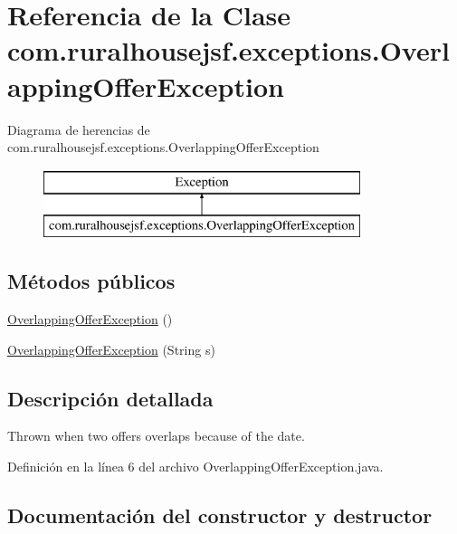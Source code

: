 \hypertarget{classcom_1_1ruralhousejsf_1_1exceptions_1_1_overlapping_offer_exception}{}\section{Referencia de la Clase com.\+ruralhousejsf.\+exceptions.\+Overlapping\+Offer\+Exception}
\label{classcom_1_1ruralhousejsf_1_1exceptions_1_1_overlapping_offer_exception}
Diagrama de herencias de com.\+ruralhousejsf.\+exceptions.\+Overlapping\+Offer\+Exception\begin{figure}[H]
\begin{center}
\leavevmode
\includegraphics[height=2.000000cm]{classcom_1_1ruralhousejsf_1_1exceptions_1_1_overlapping_offer_exception}
\end{center}
\end{figure}
\subsection*{Métodos públicos}
\begin{DoxyCompactItemize}
\item 
\mbox{\hyperlink{classcom_1_1ruralhousejsf_1_1exceptions_1_1_overlapping_offer_exception_a2386ba3955f5299aeb00c053d4f831fb}{Overlapping\+Offer\+Exception}} ()
\item 
\mbox{\hyperlink{classcom_1_1ruralhousejsf_1_1exceptions_1_1_overlapping_offer_exception_a7961de1dd207f4d451ba28b8b343a283}{Overlapping\+Offer\+Exception}} (String s)
\end{DoxyCompactItemize}


\subsection{Descripción detallada}
Thrown when two offers overlaps because of the date. 

Definición en la línea 6 del archivo Overlapping\+Offer\+Exception.\+java.



\subsection{Documentación del constructor y destructor}
\mbox{\label{classcom_1_1ruralhousejsf_1_1exceptions_1_1_overlapping_offer_exception_a2386ba3955f5299aeb00c053d4f831fb}} 
